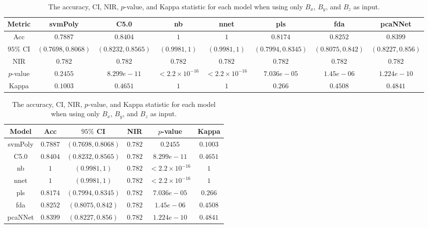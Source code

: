 \begin{table}[!ht]
	\centering
	\begin{tabular}{|c|c|c|c|c|c|c|c|}
		\hline
		Metric & svmPoly & C5.0 & nb & nnet & pls & fda & pcaNNet \\ \hline
		Acc & $0.7887$ & $0.8404$ & $1$ & $1$ & $0.8174$ & $0.8252$ & $0.8399$ \\ \hline
		$95\%$ CI & $(0.7698, 0.8068)$ & $(0.8232, 0.8565)$ & $(0.9981, 1)$ & $(0.9981, 1)$ & $(0.7994, 0.8345)$ & $(0.8075, 0.842)$ & $(0.8227, 0.856)$ \\ \hline
		NIR & $0.782$ & $0.782$ & $0.782$ & $0.782$ & $0.782$ & $0.782$ & $0.782$ \\ \hline
		$p$-value & $0.2455$ & $8.299e-11$ & $< 2.2 \times {10}^{-16}$ & $< 2.2 \times {10}^{-16}$ & $7.036e-05$ & $1.45e-06$ & $1.224e-10$ \\ \hline
		Kappa & $0.1003$ & $0.4651$ & $1$ & $1$ & $0.266$ & $0.4508$ & $0.4841$ \\ \hline
	\end{tabular}
	\caption{The accuracy, CI, NIR, $p$-value, and Kappa statistic for each model when using only $B_{x}$, $B_{y}$, and $B_{z}$ as input.}
	\label{tab:stats:coord}
\end{table}

\begin{table}[!ht]
	\centering
	\begin{tabular}{|c|c|c|c|c|c|}
		\hline
		Model & Acc & $95\%$ CI & NIR & $p$-value & Kappa \\ \hline
		svmPoly & $0.7887$ & $(0.7698, 0.8068)$ & $0.782$ & $0.2455$ & $0.1003$ \\ \hline
		C5.0 & $0.8404$ & $(0.8232, 0.8565)$ & $0.782$ & $8.299e-11$ & $0.4651$ \\ \hline
		nb & $1$ & $(0.9981, 1)$ & $0.782$ & $< 2.2 \times {10}^{-16}$ & $1$ \\ \hline
		nnet & $1$ & $(0.9981, 1)$ & $0.782$ & $< 2.2 \times {10}^{-16}$ & $1$ \\ \hline
		pls & $0.8174$ & $(0.7994, 0.8345)$ & $0.782$ & $7.036e-05$ & $0.266$ \\ \hline
		fda & $0.8252$ & $(0.8075, 0.842)$ & $0.782$ & $1.45e-06$ & $0.4508$ \\ \hline
		pcaNNet & $0.8399$ & $(0.8227, 0.856)$ & $0.782$ & $1.224e-10$ & $0.4841$ \\ \hline
	\end{tabular}
	\caption{The accuracy, CI, NIR, $p$-value, and Kappa statistic for each model when using only $B_{x}$, $B_{y}$, and $B_{z}$ as input.}
	\label{tab:stats:reverse:coord}
\end{table}

